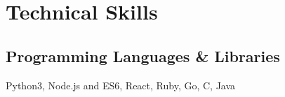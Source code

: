 \documentclass[]{deedy-resume-openfont}
\begin{document}
\begin{minipage}[t]{0.33\textwidth}



    \section{Technical Skills}
    \subsection{Programming Languages \& Libraries}
    \vspace{\topsep} %
    Python3, Node.js and ES6, React, Ruby, Go,
    C, Java \\
    \vspace{\topsep} %
    \vspace{\topsep} %
    

\end{minipage}
\end{document}
